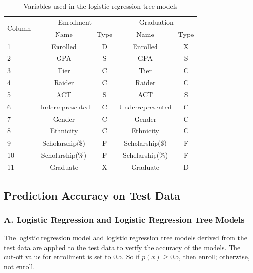 \documentclass[12pt,english]{report}
\begin{document}
\begin{table}[H]
\centering
\begin{tabular}{|l|c|c|c|c|}
\hline \hline
\multicolumn{1}{|c|}{\multirow{2}{*}{Column}} & \multicolumn{2}{c|}{Enrollment}
& \multicolumn{2}{c|}{Graduation}                            \\ \cline{2-5}
\multicolumn{1}{|c|}{}                        & Name                          &
Type                     & Name                          & Type
\\ \hline
1                                             & Enrolled                      &
D                        & Enrolled                      & X
\\ \hline
2                                             & GPA                           &
S                        & GPA                           & S
\\ \hline
3      & Tier   & C    &   Tier   & C    \\ \hline
4    & Raider     & C   &   Raider  & C   \\ \hline
5   & ACT    & S  &  ACT    & S     \\ \hline
6   & Underrepresented & C     & Underrepresented    & C   \\ \hline
7    & Gender   & C   &  Gender  & C   \\ \hline
8   & Ethnicity    & C     & Ethnicity   & C      \\ \hline
9   & Scholarship(\$)    & F   & Scholarship(\$)     & F    \\ \hline
10  & Scholarship(\%)   & F     & Scholarship(\%)     & F  \\ \hline
11  & Graduate   & X     &   Graduate        & D         \\ \hline

\end{tabular}
\caption{Variables used in the logistic regression tree models}
\end{table}

\subsection{Prediction Accuracy on Test Data}
\subsubsection{A. Logistic Regression and Logistic Regression Tree Models }
The logistic regression model and logistic regression tree models derived from the test data are applied to the test data to verify the accuracy of the models.  The cut-off value for enrollment is set to 0.5. So if  $p(x) \geq 0.5$, then enroll;  otherwise, not enroll.   
\end{document}
